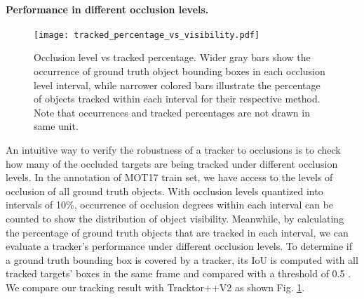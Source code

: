 \documentclass[final]{cvpr}
\begin{document}

\paragraph{Performance in different occlusion levels.}

\begin{figure}[t]
\begin{center}
    \texttt{[image: tracked\_percentage\_vs\_visibility.pdf]}
\end{center}
   \caption{Occlusion level vs tracked percentage. Wider gray bars show the occurrence of ground truth object bounding boxes in each occlusion level interval, while narrower colored bars illustrate the percentage of objects tracked within each interval for their respective method. Note that occurrences and tracked percentages are not drawn in same unit.}
\label{fig:visibility}
\end{figure}

An intuitive way to verify the robustness of a tracker to occlusions is to check how many of the occluded targets are being tracked under different occlusion levels. In the annotation of MOT17 train set, we have access to the levels of occlusion of all ground truth objects. With occlusion levels quantized into intervals of 10\%, occurrence of occlusion degrees within each interval can be counted to show the distribution of object visibility. Meanwhile, by calculating the percentage of ground truth objects that are tracked in each interval, we can evaluate a tracker's performance under different occlusion levels.
To determine if a ground truth bounding box is covered by a tracker, its IoU is computed with all tracked targets' boxes in the same frame and compared with a threshold of 0.5 \cite{Ristani2016}.
We compare our tracking result with Tracktor++V2 \cite{Bergmann2019a} as shown Fig. \ref{fig:visibility}.
\end{document}
